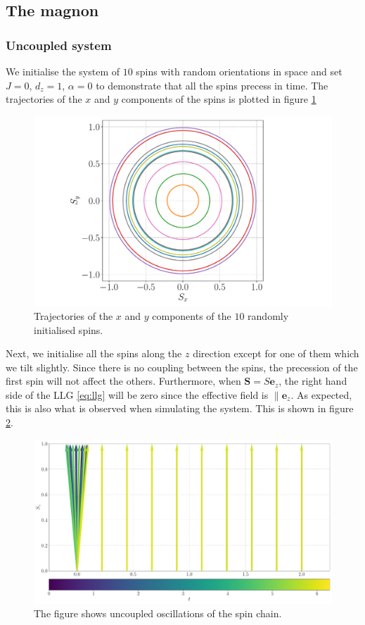 \subsection{The magnon}

\subsubsection{Uncoupled system}

We initialise the system of $10$ spins with random orientations in space and set $J = 0$, $d_z = 1$, $\alpha = 0$ to demonstrate that all the spins precess in time. The trajectories of the $x$ and $y$ components of the spins is plotted in figure \ref{fig:precessionsxy}

\begin{figure}[htb]
	\centering
	\includegraphics[width=0.8\columnwidth]{../fig/precession_xy.pdf}
	\caption{Trajectories of the $x$ and $y$ components of the $10$ randomly initialised spins.}
	\label{fig:precessionsxy}
\end{figure}

Next, we initialise all the spins along the $z$ direction except for one of them which we tilt slightly. Since there is no coupling between the spins, the precession of the first spin will not affect the others. Furthermore, when $\mathbf{S} = S\mathbf{e}_z$, the right hand side of the LLG \eqref{eq:llg} will be zero since the effective field is $\parallel \mathbf{e}_z$. As expected, this is also what is observed when simulating the system. This is shown in figure \ref{fig:precessions}.

\begin{figure}[htb]
	\centering
	\includegraphics[width=\columnwidth]{../fig/10_precessions.pdf}
	\caption{The figure shows uncoupled oscillations of the spin chain.}
	\label{fig:precessions}
\end{figure}


